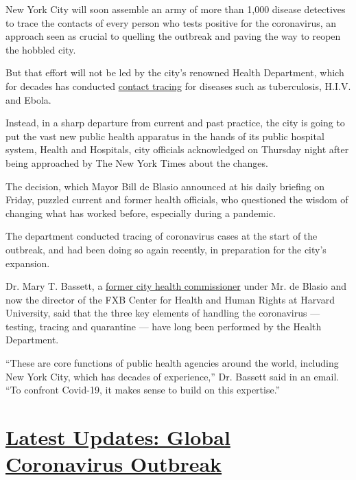 New York City will soon assemble an army of more than 1,000 disease
detectives to trace the contacts of every person who tests positive for
the coronavirus, an approach seen as crucial to quelling the outbreak
and paving the way to reopen the hobbled city.

But that effort will not be led by the city's renowned Health
Department, which for decades has conducted
\href{https://www.nytimes3xbfgragh.onion/2020/06/21/nyregion/nyc-contact-tracing.html}{contact
tracing} for diseases such as tuberculosis, H.I.V. and Ebola.

Instead, in a sharp departure from current and past practice, the city
is going to put the vast new public health apparatus in the hands of its
public hospital system, Health and Hospitals, city officials
acknowledged on Thursday night after being approached by The New York
Times about the changes.

The decision, which Mayor Bill de Blasio announced at his daily briefing
on Friday, puzzled current and former health officials, who questioned
the wisdom of changing what has worked before, especially during a
pandemic.

The department conducted tracing of coronavirus cases at the start of
the outbreak, and had been doing so again recently, in preparation for
the city's expansion.

Dr. Mary T. Bassett, a
\href{https://www.nytimes3xbfgragh.onion/2018/08/02/nyregion/nyc-health-mary-bassett-resignation.html}{former
city health commissioner} under Mr. de Blasio and now the director of
the FXB Center for Health and Human Rights at Harvard University, said
that the three key elements of handling the coronavirus --- testing,
tracing and quarantine --- have long been performed by the Health
Department.

``These are core functions of public health agencies around the world,
including New York City, which has decades of experience,'' Dr. Bassett
said in an email. ``To confront Covid-19, it makes sense to build on
this expertise.''

\hypertarget{latest-updates-global-coronavirus-outbreak}{%
\section{\texorpdfstring{\href{https://www.nytimes3xbfgragh.onion/2020/08/04/world/coronavirus-cases.html?action=click\&pgtype=Article\&state=default\&region=MAIN_CONTENT_1\&context=storylines_live_updates}{Latest
Updates: Global Coronavirus
Outbreak}}{Latest Updates: Global Coronavirus Outbreak}}\label{latest-updates-global-coronavirus-outbreak}}

